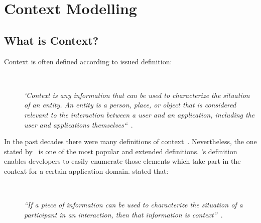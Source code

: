 \section{Context Modelling}
\label{sec:context}
\subsection{What is Context?}
\label{sec:context_definition}

Context is often defined according to \citeauthor{dey_understanding_2001}
issued definition:

\begin{description}
  \item[] \hfill \\
  \begin{mdframed}[hidealllines=true,backgroundcolor=gray!20]
  \textit{`Context is any information that can be used to characterize the situation
  of an entity. An entity is a person, place, or object that is considered 
  relevant to the interaction between a user and an application, including the 
  user and applications themselves``}~\citep{dey_understanding_2001}.
  \end{mdframed}
\end{description}

In the past decades there were many definitions of context~\citep{adomavicius_context_aware_2011}.
Nevertheless, the one stated by~\citet{dey_understanding_2001} is one of the most
popular and extended definitions. \citeauthor{dey_understanding_2001}'s 
definition enables developers to easily enumerate those elements which take part 
in the context for a certain application domain. \citeauthor{dey_understanding_2001} stated that:

\begin{description}
  \item[] \hfill \\
  \begin{mdframed}[hidealllines=true,backgroundcolor=gray!20]
  \textit{``If a piece of information can be used to characterize the situation 
  of a participant in an interaction, then that information is context''~\citep{dey_understanding_2001}}.
  \end{mdframed}
\end{description}


